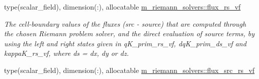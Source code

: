 \textbf{ }\par
\begin{DoxyCompactItemize}
\item 
type(scalar\+\_\+field), dimension(\+:), allocatable \hyperlink{namespacem__riemann__solvers_a3d8e1f9ad9ca68e97109e0cff7aa1c4b}{m\+\_\+riemann\+\_\+solvers\+::flux\+\_\+rs\+\_\+vf}
\begin{DoxyCompactList}\small\item\em The cell-\/boundary values of the fluxes (src -\/ source) that are computed through the chosen Riemann problem solver, and the direct evaluation of source terms, by using the left and right states given in q\+K\+\_\+prim\+\_\+rs\+\_\+vf, dq\+K\+\_\+prim\+\_\+ds\+\_\+vf and kappa\+K\+\_\+rs\+\_\+vf, where ds = dx, dy or dz. \end{DoxyCompactList}\item 
type(scalar\+\_\+field), dimension(\+:), allocatable \hyperlink{namespacem__riemann__solvers_a0b6d2f192a1df76abc59b85b03f7a187}{m\+\_\+riemann\+\_\+solvers\+::flux\+\_\+src\+\_\+rs\+\_\+vf}
\end{DoxyCompactItemize}

